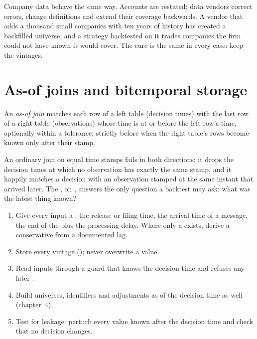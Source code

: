 Company data behave the same way. Accounts are restated; data vendors correct errors, change definitions and extend their
coverage backwards. A vendor that adds a thousand small companies with ten years of history has created a backfilled
universe, and a strategy backtested on it trades companies the firm could not have known it would cover. The cure is the same
in every case: keep the vintages.

\section{As-of joins and bitemporal storage}

\begin{definition}[As-of join]\label{def:rs:point-in-time-data-and-the-biases:asof}
An \emph{as-of join} matches each row of a left table (decision times) with the last row of a right table
(observations) whose time is at or before the left row's time, optionally within a tolerance; strictly before when the right
table's rows become known only after their stamp.
\end{definition}

An ordinary join on equal time stamps fails in both directions: it drops the decision times at which no observation has
exactly the same stamp, and it happily matches a decision with an observation stamped at the same instant that arrived later.
The , on , answers the only question a backtest may ask: what was the latest thing known?

\begin{method}\label{met:rs:point-in-time-data-and-the-biases:pit}
\begin{enumerate}
\item Give every input a : the release or filing time, the arrival time of a message, the end of the  plus the
processing delay. Where only a  exists, derive a conservative  from a documented lag.
\item Store every vintage (); never overwrite a value.
\item Read inputs through a guard that knows the decision time and refuses any later .
\item Build universes, identifiers and adjustments as of the decision time as well (chapter~4).
\item Test for leakage: perturb every value known after the decision time and check that no decision changes.
\end{enumerate}
\end{method}

